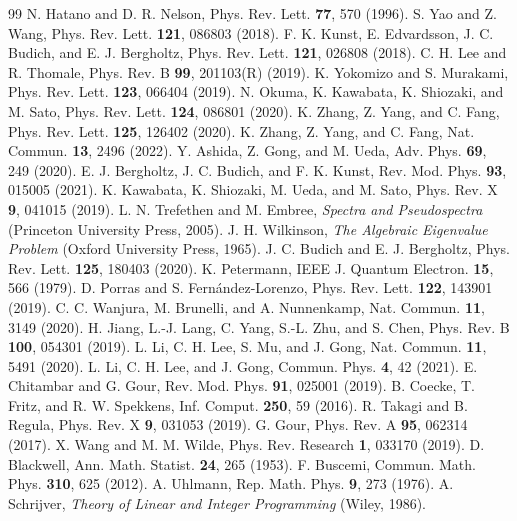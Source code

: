 \documentclass[11pt]{article}
\theoremstyle{definition}
\theoremstyle{remark}
\begin{document}
\begin{thebibliography}{99}
 N. Hatano and D. R. Nelson, Phys. Rev. Lett. \textbf{77}, 570 (1996).
 S. Yao and Z. Wang, Phys. Rev. Lett. \textbf{121}, 086803 (2018).
 F. K. Kunst, E. Edvardsson, J. C. Budich, and E. J. Bergholtz, Phys. Rev. Lett. \textbf{121}, 026808 (2018).
 C. H. Lee and R. Thomale, Phys. Rev. B \textbf{99}, 201103(R) (2019).
 K. Yokomizo and S. Murakami, Phys. Rev. Lett. \textbf{123}, 066404 (2019).
 N. Okuma, K. Kawabata, K. Shiozaki, and M. Sato, Phys. Rev. Lett. \textbf{124}, 086801 (2020).
 K. Zhang, Z. Yang, and C. Fang, Phys. Rev. Lett. \textbf{125}, 126402 (2020).
 K. Zhang, Z. Yang, and C. Fang, Nat. Commun. \textbf{13}, 2496 (2022).
 Y. Ashida, Z. Gong, and M. Ueda, Adv. Phys. \textbf{69}, 249 (2020).
 E. J. Bergholtz, J. C. Budich, and F. K. Kunst, Rev. Mod. Phys. \textbf{93}, 015005 (2021).
 K. Kawabata, K. Shiozaki, M. Ueda, and M. Sato, Phys. Rev. X \textbf{9}, 041015 (2019).
 L. N. Trefethen and M. Embree, \emph{Spectra and Pseudospectra} (Princeton University Press, 2005).
 J. H. Wilkinson, \emph{The Algebraic Eigenvalue Problem} (Oxford University Press, 1965).
 J. C. Budich and E. J. Bergholtz, Phys. Rev. Lett. \textbf{125}, 180403 (2020).
 K. Petermann, IEEE J. Quantum Electron. \textbf{15}, 566 (1979).
 D. Porras and S. Fern\'andez-Lorenzo, Phys. Rev. Lett. \textbf{122}, 143901 (2019).
 C. C. Wanjura, M. Brunelli, and A. Nunnenkamp, Nat. Commun. \textbf{11}, 3149 (2020).
 H. Jiang, L.-J. Lang, C. Yang, S.-L. Zhu, and S. Chen, Phys. Rev. B \textbf{100}, 054301 (2019).
 L. Li, C. H. Lee, S. Mu, and J. Gong, Nat. Commun. \textbf{11}, 5491 (2020).
 L. Li, C. H. Lee, and J. Gong, Commun. Phys. \textbf{4}, 42 (2021).
 E. Chitambar and G. Gour, Rev. Mod. Phys. \textbf{91}, 025001 (2019).
 B. Coecke, T. Fritz, and R. W. Spekkens, Inf. Comput. \textbf{250}, 59 (2016).
 R. Takagi and B. Regula, Phys. Rev. X \textbf{9}, 031053 (2019).
 G. Gour, Phys. Rev. A \textbf{95}, 062314 (2017).
 X. Wang and M. M. Wilde, Phys. Rev. Research \textbf{1}, 033170 (2019).
 D. Blackwell, Ann. Math. Statist. \textbf{24}, 265 (1953).
 F. Buscemi, Commun. Math. Phys. \textbf{310}, 625 (2012).
 A. Uhlmann, Rep. Math. Phys. \textbf{9}, 273 (1976).
 A. Schrijver, \emph{Theory of Linear and Integer Programming} (Wiley, 1986).
\end{thebibliography}
\end{document}
